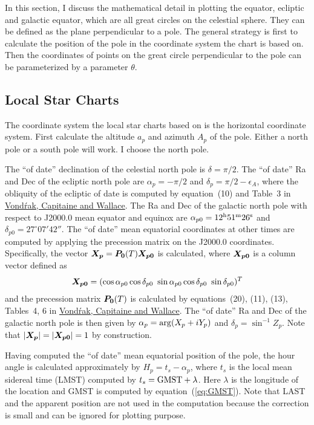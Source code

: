 \documentclass[12pt]{article}
\newcommand \beq {\begin{equation}}
\newcommand \eeq {\end{equation}}
\newcommand{\ve}[1]{\mbox{\boldmath $#1$}}
\begin{document}
In this section, I discuss the mathematical detail in plotting the 
equator, ecliptic and galactic equator, which are all great circles on 
the celestial sphere. They can be defined as the plane perpendicular to 
a pole. The general strategy is first to calculate the position of the pole 
in the coordinate system the chart is based on. Then the coordinates of points 
on the great circle perpendicular to the pole can be parameterized by a parameter 
$\theta$.

\subsection{Local Star Charts} 

The coordinate system the local star charts based on is the horizontal 
coordinate system. First calculate the altitude $a_p$ and azimuth $A_p$ 
of the pole. Either a north pole or a south pole will work. I choose the 
north pole. 

The ``of date'' declination of the celestial north pole is $\delta=\pi/2$. 
The ``of date'' Ra and Dec of the ecliptic north pole are $\alpha_p=-\pi/2$ and 
$\delta_p = \pi/2-\epsilon_A$, where the obliquity of the ecliptic of date 
is computed by equation~(10) and Table~3 in
\href{http://adsabs.harvard.edu/abs/2011A%26A...534A..22V}{Vond\'rak,
Capitaine and Wallace}. 
The Ra and Dec of the galactic north pole with respect to J2000.0 mean equator 
and equinox are $\alpha_{p0} = 12^{\rm h} 51^{\rm m} 26^{\rm s}$ and 
$\delta_{p0} = 27^\circ 07' 42''$. The ``of date'' mean equatorial coordinates 
at other times are computed
by applying the precession matrix on the J2000.0 coordinates. Specifically, 
the vector $\ve{X_p}=\ve{P_0}(T) \ve{X_{p0}}$ is calculated, where $\ve{X_{p0}}$ is 
a column vector defined as 
\beq
  \ve{X_{p0}}=(\cos \alpha_{p0} \cos \delta_{p0}\ \sin \alpha_{p0} \cos \delta_{p0} \ 
\sin \delta_{p0})^T
\eeq
and the precession matrix $\ve{P_0}(T)$ is calculated by 
equations~(20), (11), (13), Tables~4, 6 in 
\href{http://adsabs.harvard.edu/abs/2011A%26A...534A..22V}{Vond\'rak, Capitaine and Wallace}. 
The ``of date'' Ra and Dec of the galactic north pole is then given by 
$\alpha_p = {\rm arg}(X_p+iY_p)$ and $\delta_p = \sin^{-1} Z_p$. 
Note that $|\ve{X_p}|=|\ve{X_{p0}}|=1$ by construction.

Having computed the ``of date'' mean equatorial position of the pole, the hour angle 
is calculated approximately by $H_p=t_s - \alpha_p$, where $t_s$ is the local mean 
sidereal time (LMST) computed by $t_s = {\rm GMST}+\lambda$. 
Here $\lambda$ is the longitude of the location and GMST is computed
by equation~(\ref{eq:GMST}). Note that LAST and the apparent position are not 
used in the computation because the correction is
small and can be ignored for plotting purpose.
\end{document}
